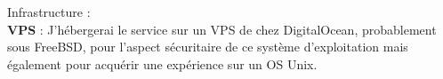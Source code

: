 \documentclass[a4paper,10pt,final,fleqn]{article}
\begin{document}
		Infrastructure : \\

		\textbf{VPS} : J'hébergerai le service sur un VPS de chez DigitalOcean, probablement sous FreeBSD, pour l'aspect sécuritaire de ce système d'exploitation mais également pour acquérir une expérience sur un OS Unix.\\
\end{document}
